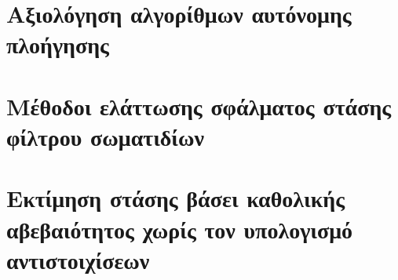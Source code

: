 \chapter{Αξιολόγηση αλγορίθμων αυτόνομης πλοήγησης}
  \label{appendix:01}
  

\chapter{Μέθοδοι ελάττωσης σφάλματος στάσης φίλτρου σωματιδίων}
  \label{appendix:02}
  

\chapter{Εκτίμηση στάσης βάσει καθολικής αβεβαιότητος χωρίς τον υπολογισμό αντιστοιχίσεων}
  \label{appendix:03}
  

